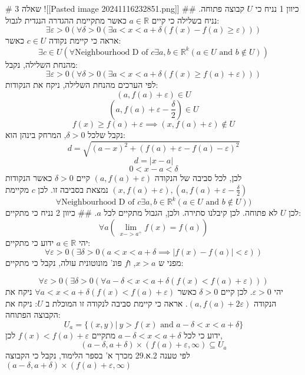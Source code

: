 # שאלה 3
![[Pasted image 20241116232851.png]]
## כיוון 1
נניח כי $U$ קבוצה פתוחה.
נניח בשלילה כי קיים $a \in \mathbb{R}$ כאשר מתקיימת ההגדרה הנגדית לגבול:
$$\exists \varepsilon>0(\forall \delta>0(\exists a<x<a+\delta(f(x)-f(a) \ge \varepsilon)))$$
אראה כי קיימת נקודה $c \in U$ כאשר:
$$\exists c\in U(\forall \text{Neighbourhood D of }c \exists a,b \in \mathbb{R}^k(a \in U \text{ and } b \notin U))$$
מהנחת השלילה, נקבל:
$$\exists \varepsilon>0(\forall \delta>0(\exists a<x<a+\delta(f(x) \ge f(a)+\varepsilon)))$$
לפי הערכים מהנחת השלילה, ניקח את הנקודות: 
$$(a,f(a)+\varepsilon) \in U$$
$$(a,f(a)+\varepsilon-\frac{\delta}{2}) \in U$$
$$f(x) \ge f(a)+\varepsilon \implies (x,f(a)+\varepsilon) \notin U$$
נקבל שלכל $\delta>0$, המרחק בינהן הוא:
$$d = \sqrt{(a-x)^2+(f(a)+\varepsilon - f(a) - \varepsilon)^2}$$
$$d = |x-a|$$
$$0 < x-a < \delta$$
לכן, לכל סביבה של הנקודה $(a,f(a)+\varepsilon)$
קיים $\delta > 0$ כאשר הנקודות $(x,f(a)+\varepsilon),(a,f(a)+\varepsilon-\frac{\delta}{2})$ נמצאת בסביבה זו.
לכן $c$ מקיימת
$$\forall \text{Neighbourhood D of }c \exists a,b \in \mathbb{R}^k(a \in U \text{ and } b \notin U))$$
לכן $U$ לא פתוחה. לכן קיבלנו סתירה.
ולכן, הגבול מתקיים לכל $a$.
## כיוון 2
נניח כי מתקיים:
$$\forall a(\ \lim_{x->a^+}{f(x)}=f(a))$$
יהי $a \in \mathbb{R}$
ידוע כי מתקיים:
$$\forall \varepsilon>0(\exists \delta>0(a<x<a+\delta \implies |f(x)-f(a)| < \varepsilon))$$
מפני ש $x>a$, ו$f$ פונ' מונוטונית עולה, נקבל כי מתקיים:

$$\forall \varepsilon>0(\exists \delta>0(\forall a-\delta<x<a+\delta (f(x) < f(a)+\varepsilon)))$$
יהי $\varepsilon>0$. לכן קיים $\delta>0$ כאשר $\forall a<x<a+\delta (f(x) < f(a)+\varepsilon)$
ניקח את הנקודה $(a,f(a)+2\varepsilon)$. 
אראה כי קיימת סביבה לנקודה זו המוכלת ב $U$:
ניקח את הקבוצה הפתוחה:
$$U_a = \{(x,y)|\ y>f(x) \text{ and } a-\delta<x<a+\delta \}$$
ידוע כי לכל $a-\delta<x<a+\delta$ מתקיים $f(x)<f(a)+\varepsilon$
לכן,
$$(a-\delta,a+\delta) \times (f(a)+\varepsilon,\infty) \subseteq U_a$$
לפי טענה 2.א.29 מכרך א' בספר הלימוד,
נקבל כי הקבוצה $(a-\delta,a+\delta) \times (f(a)+\varepsilon,\infty)$
